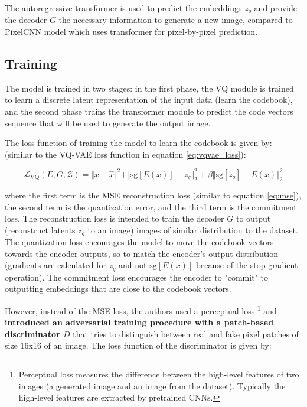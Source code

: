 The autoregressive transformer is used to predict the embeddings $z_q$ and provide the decoder $G$ the necessary information to generate a new image, compared to PixelCNN model \cite{pixelcnn} which uses transformer for pixel-by-pixel prediction.




\subsection{Training}

The model is trained in two stages: in the first phase, the VQ module is trained to learn a discrete latent representation of the input data (learn the codebook), and the second phase trains the transformer module to predict the code vectors sequence that will be used to generate the output image.

The loss function of training the model to learn the codebook is given by: (similar to the VQ-VAE loss function in equation \ref{eq:vqvae_loss}):

\begin{equation}
    \mathcal{L}_{\text{VQ}} (E, G, \mathcal{Z}) = \Vert x - \hat{x} \Vert ^2 + \Vert \text{sg}[E(x)] - z_q \Vert ^2_2 +  \beta \Vert \text{sg}[z_q] - E(x) \Vert ^2_2
\end{equation}

where the first term is the MSE reconstruction loss (similar to equation \ref{eq:mse}), the second term is the quantization error, and the third term is the commitment loss. The reconstruction loss is intended to train the decoder $G$ to output (reconstruct latents $z_q$ to an image) images of similar distribution to the dataset. The quantization loss encourages the model to move the codebook vectors towards the encoder outputs, so to match the encoder's output distribution (gradients are calculated for $z_q$ and not $\text{sg}[E(x)]$ because of the stop gradient operation). The commitment loss encourages the encoder to "commit" to outputting embeddings that are close to the codebook vectors.

However, instead of the MSE loss, the authors used a perceptual loss \cite{perceptual_loss} \footnote[4]{Perceptual loss measures the difference between the high-level features of two images (a generated image and an image from the dataset). Typically the high-level features are extracted by pretrained CNNs.} and \textbf{introduced an adversarial training procedure with a patch-based discriminator $D$} that tries to distinguish between real and fake pixel patches of size 16x16 of an image. The loss function of the discriminator is given by:

